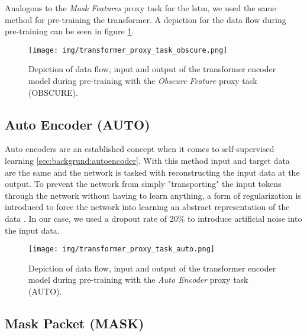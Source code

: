 Analogous to the \textit{Mask Features} proxy task for the \gls{lstm}, we used the same method for pre-training the transformer. A depiction for the data flow during pre-training can be seen in figure \ref{fig:experiments:transformer:obscure}.

\begin{figure}[]
	\centering
	\texttt{[image: img/transformer\_proxy\_task\_obscure.png]}
	\caption{Depiction of data flow, input and output of the transformer encoder model during pre-training with the \textit{Obscure Feature} proxy task (OBSCURE). }
	\label{fig:experiments:transformer:obscure}
\end{figure}

\subsection{Auto Encoder (AUTO)} \label{sec:experiments:transformer:auto_encoder}

Auto encoders are an established concept when it comes to self-supervised learning \ref{sec:backgrund:autoencoder}. With this method input and target data are the same and the network is tasked with reconstructing the input data at the output. To prevent the network from simply "transporting" the input tokens through the network without having to learn anything, a form of regularization is introduced to force the network into learning an abstract representation of the data \cite{autoencoders}. In our case, we used a dropout rate of 20\% to introduce artificial noise into the input data. 

\begin{figure}[]
	\centering
	\texttt{[image: img/transformer\_proxy\_task\_auto.png]}
	\caption{Depiction of data flow, input and output of the transformer encoder model during pre-training with the \textit{Auto Encoder} proxy task (AUTO). }
	\label{fig:experiments:transformer:auto}
\end{figure}


\subsection{Mask Packet (MASK)} \label{sec:experiments:transformer:mask_packet}


